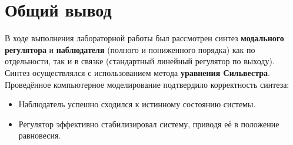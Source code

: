 \section{Общий вывод}
В ходе выполнения лабораторной работы был рассмотрен синтез \textbf{модального регулятора} и \textbf{наблюдателя} (полного и пониженного порядка) как по отдельности, так и в связке (стандартный линейный регулятор по выходу). Синтез осуществлялся с использованием метода \textbf{уравнения Сильвестра}. Проведённое компьютерное моделирование подтвердило корректность синтеза:
\begin{itemize}
    \item Наблюдатель успешно сходился к истинному состоянию системы.
    \item Регулятор эффективно стабилизировал систему, приводя её в положение равновесия.
\end{itemize}